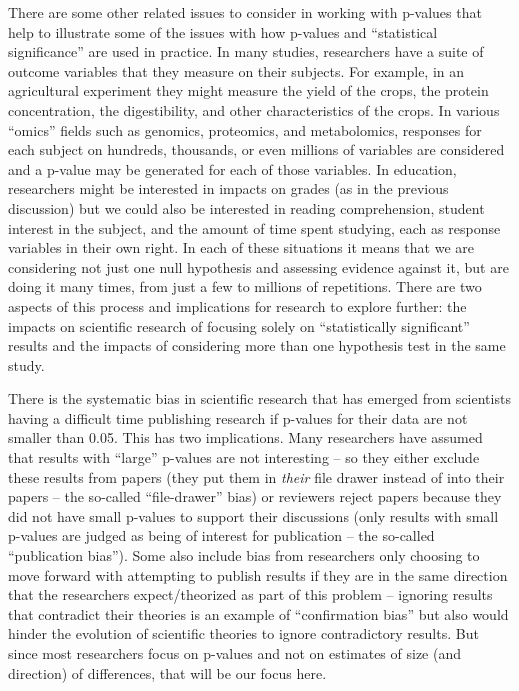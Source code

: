 \documentclass[
]{book}
\begin{document}
\indent There are some other related issues to consider in working with p-values that help to illustrate some of the issues with how p-values and ``statistical significance'' are used in practice. In many studies, researchers have a suite of outcome variables that they measure on their subjects. For example, in an agricultural experiment they might measure the yield of the crops, the protein concentration, the digestibility, and other characteristics of the crops. In various ``omics'' fields such as genomics, proteomics, and metabolomics, responses for each subject on hundreds, thousands, or even millions of variables are considered and a p-value may be generated for each of those variables. In education, researchers might be interested in impacts on grades (as in the previous discussion) but we could also be interested in reading comprehension, student interest in the subject, and the amount of time spent studying, each as response variables in their own right. In each of these situations it means that we are considering not just one null hypothesis and assessing evidence against it, but are doing it many times, from just a few to millions of repetitions. There are two aspects of this process and implications for research to explore further: the impacts on scientific research of focusing solely on ``statistically significant'' results and the impacts of considering more than one hypothesis test in the same study.

\indent There is the systematic bias in scientific research that has emerged from scientists having a difficult time publishing research if p-values for their data are not smaller than 0.05. This has two implications. Many researchers have assumed that results with ``large'' p-values are not interesting -- so they either exclude these results from papers (they put them in \emph{their} file drawer instead of into their papers -- the so-called ``file-drawer'' bias)  or reviewers reject papers because they did not have small p-values to support their discussions (only results with small p-values are judged as being of interest for publication -- the so-called ``publication bias'').  Some also include bias from researchers only choosing to move forward with attempting to publish results if they are in the same direction that the researchers expect/theorized as part of this problem -- ignoring results that contradict their theories is an example of ``confirmation bias''  but also would hinder the evolution of scientific theories to ignore contradictory results. But since most researchers focus on p-values and not on estimates of size (and direction) of differences, that will be our focus here.
\end{document}
